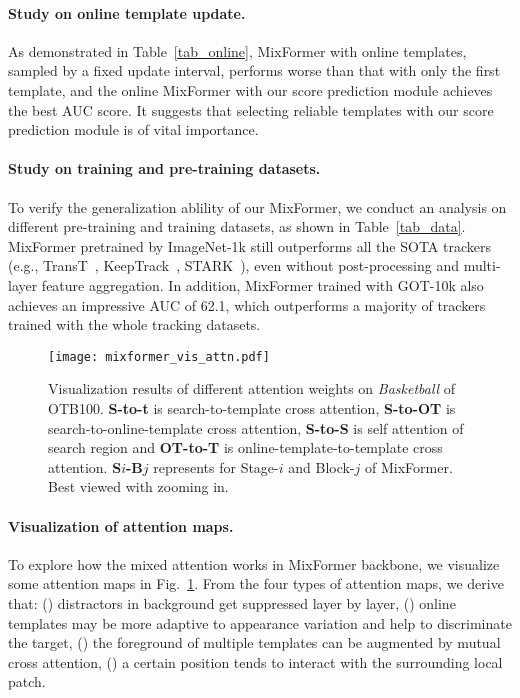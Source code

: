 \paragraph{Study on online template update.}
As demonstrated in Table~\ref{tab_online}, MixFormer with online templates, sampled by a fixed update interval, performs worse than that with only the first template, and the online MixFormer with our score prediction module achieves the best AUC score. It suggests that selecting reliable templates with our score prediction module is of vital importance.
\vspace{-4mm}
\paragraph{Study on training and pre-training datasets.}
To verify the generalization ablility of our MixFormer, we conduct an analysis on different pre-training and training datasets, as shown in Table~\ref{tab_data}. MixFormer pretrained by ImageNet-1k still outperforms all the SOTA trackers (e.g., TransT~\cite{tt}, KeepTrack~\cite{keeptrack}, STARK~\cite{stark}), even without post-processing and multi-layer feature aggregation. In addition, MixFormer trained with GOT-10k also achieves an impressive AUC of 62.1, which outperforms a majority of trackers trained with the whole tracking datasets.

\begin{figure}[pt]
\centering
\texttt{[image: mixformer\_vis\_attn.pdf]}
\vspace{-4mm}
\caption{Visualization results of different attention weights on \textit{Basketball} of OTB100. \textbf{S-to-t} is search-to-template cross attention, \textbf{S-to-OT} is search-to-online-template cross attention, \textbf{S-to-S} is self attention of search region and \textbf{OT-to-T} is online-template-to-template cross attention. \textbf{S$i$-B$j$} represents for Stage-$i$ and Block-$j$ of MixFormer. Best viewed with zooming in.}
\vspace{-6mm}
\label{fig:vis_attn_bas}
\end{figure}

\vspace{-4mm}
\paragraph{Visualization of attention maps.}
\label{vis_attn}
To explore how the mixed attention works in MixFormer backbone, we visualize some attention maps in Fig.~\ref{fig:vis_attn_bas}. From the four types of attention maps, we derive that: () distractors in background get suppressed layer by layer, () online templates may be more adaptive to appearance variation and help to discriminate the target, () the foreground of multiple templates can be augmented by mutual cross attention, () a certain position tends to interact with the surrounding local patch.

